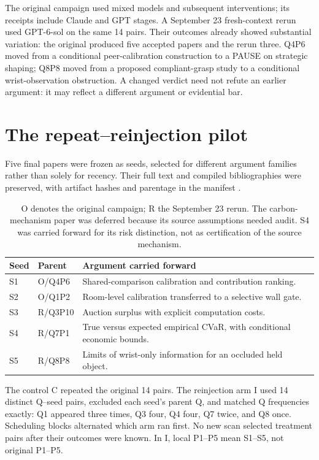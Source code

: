 \documentclass[11pt,a4paper]{article}
\begin{document}
The original campaign used mixed models and subsequent interventions; its
receipts include Claude and GPT stages. A September 23 fresh-context rerun
used GPT-6-sol on the same 14 pairs. Their outcomes already showed substantial
variation: the original produced five accepted papers and the rerun three.
Q4P6 moved from a conditional peer-calibration construction to a PAUSE on
strategic shaping; Q8P8 moved from a proposed compliant-grasp study to a
conditional wrist-observation obstruction. A changed verdict need not refute
an earlier argument: it may reflect a different argument or evidential bar.

\section{The repeat--reinjection pilot}

Five final papers were frozen as seeds, selected for different argument
families rather than solely for recency. Their full text and compiled
bibliographies were preserved, with artifact hashes and parentage in the
manifest \cite{pilot}.

\begin{table}[ht]
\centering\small
\begin{tabularx}{\linewidth}{llX}
\toprule
Seed&Parent&Argument carried forward\\
\midrule
S1&O/Q4P6&Shared-comparison calibration and contribution ranking.\\
S2&O/Q1P2&Room-level calibration transferred to a selective wall gate.\\
S3&R/Q3P10&Auction surplus with explicit computation costs.\\
S4&R/Q7P1&True versus expected empirical CVaR, with conditional economic bounds.\\
S5&R/Q8P8&Limits of wrist-only information for an occluded held object.\\
\bottomrule
\end{tabularx}
\caption{O denotes the original campaign; R the September 23 rerun.
The carbon-mechanism paper was deferred because its source assumptions needed
audit. S4 was carried forward for its risk distinction, not as certification
of the source mechanism.}
\end{table}

The control C repeated the original 14 pairs. The reinjection arm I used
14 distinct Q--seed pairs, excluded each seed's parent Q, and matched Q
frequencies exactly: Q1 appeared three times, Q3 four, Q4 four, Q7 twice,
and Q8 once. Scheduling blocks alternated which arm ran first. No new scan
selected treatment pairs after their outcomes were known. In I, local P1--P5
mean S1--S5, not original P1--P5.
\end{document}
